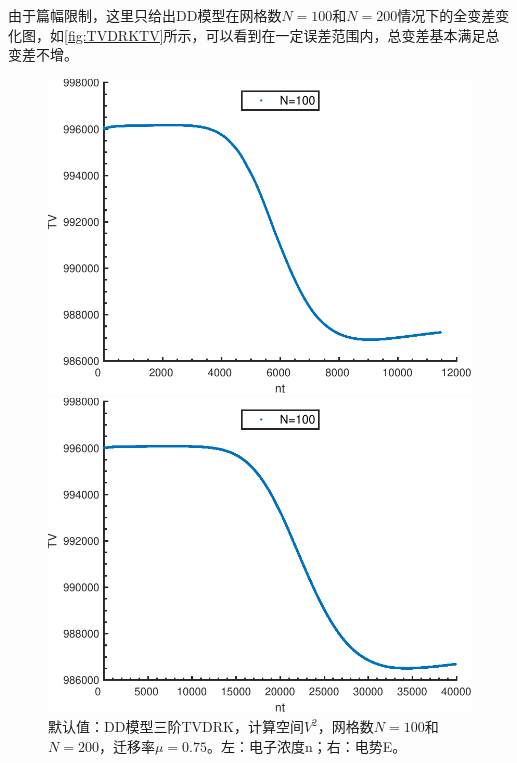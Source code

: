 由于篇幅限制，这里只给出DD模型在网格数$N=100$和$N=200$情况下的全变差变化图，如\autoref{fig:TVDRKTV}所示，可以看到在一定误差范围内，总变差基本满足总变差不增。
\begin{figure}
    \centering
    \begin{minipage}{0.48\textwidth}
        \centering
        \includegraphics[width=\linewidth]{figure/TVDRKN100.pdf}
    \end{minipage}
    \begin{minipage}{0.48\textwidth}
        \centering
        \includegraphics[width=\linewidth]{figure/TVDRKN200.pdf}
    \end{minipage}
    \caption{默认值：DD模型三阶TVDRK，计算空间$V^2$，网格数$N=100$和$N=200$，迁移率$\mu=0.75$。左：电子浓度n；右：电势E。}
    \label{fig:TVDRKTV}
\end{figure}

